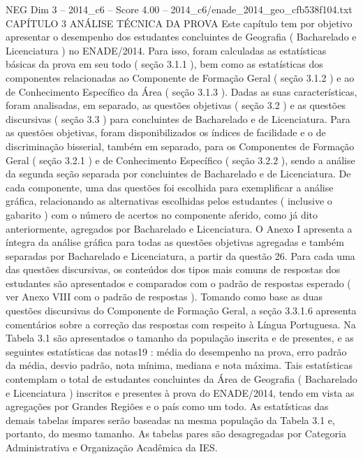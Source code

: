 \begin{textsample}{NEG Dim 3 – 2014\_c6 – Score 4.00 – 2014\_c6/enade\_2014\_geo\_cfb538f104.txt}  \label{ex:f3_neg_248}
CAPÍTULO 3 ANÁLISE TÉCNICA DA PROVA Este capítulo tem por objetivo apresentar o desempenho dos estudantes concluintes de Geografia ( Bacharelado e Licenciatura ) no ENADE/2014.
Para isso, foram calculadas as estatísticas básicas da prova em seu todo ( seção 3.1.1 ), bem como as estatísticas dos componentes relacionadas ao Componente de Formação Geral ( seção 3.1.2 ) e ao de Conhecimento Específico da Área ( seção 3.1.3 ).
Dadas as suas características, foram analisadas, em separado, as questões objetivas ( seção 3.2 ) e as questões discursivas ( seção 3.3 ) para concluintes de Bacharelado e de Licenciatura.
Para as questões objetivas, foram disponibilizados os índices de facilidade e o de discriminação bisserial, também em separado, para os Componentes de Formação Geral ( seção 3.2.1 ) e de Conhecimento Específico ( seção 3.2.2 ), sendo a análise da segunda seção separada por concluintes de Bacharelado e de Licenciatura.
De cada componente, uma das questões foi escolhida para exemplificar a análise gráfica, relacionando as alternativas escolhidas pelos estudantes ( inclusive o gabarito ) com o número de acertos no componente aferido, como já dito anteriormente, agregados por Bacharelado e Licenciatura.
O Anexo I apresenta a íntegra da análise gráfica para todas as questões objetivas agregadas e também separadas por Bacharelado e Licenciatura, a partir da questão 26.
Para cada uma das questões discursivas, os conteúdos dos tipos mais comuns de respostas dos estudantes são apresentados e comparados com o padrão de respostas esperado ( ver Anexo VIII com o padrão de respostas ).
Tomando como base as duas questões discursivas do Componente de Formação Geral, a seção 3.3.1.6 apresenta comentários sobre a correção das respostas com respeito à Língua Portuguesa.
Na Tabela 3.1 são apresentados o tamanho da população inscrita e de presentes, e as seguintes estatísticas das notas19 : média do desempenho na prova, erro padrão da média, desvio padrão, nota mínima, mediana e nota máxima.
Tais estatísticas contemplam o total de estudantes concluintes da Área de Geografia ( Bacharelado e Licenciatura ) inscritos e presentes à prova do ENADE/2014, tendo em vista as agregações por Grandes Regiões e o país como um todo.
As estatísticas das demais tabelas ímpares serão baseadas na mesma população da Tabela 3.1 e, portanto, do mesmo tamanho.
As tabelas pares são desagregadas por Categoria Administrativa e Organização Acadêmica da IES.

\end{textsample}
